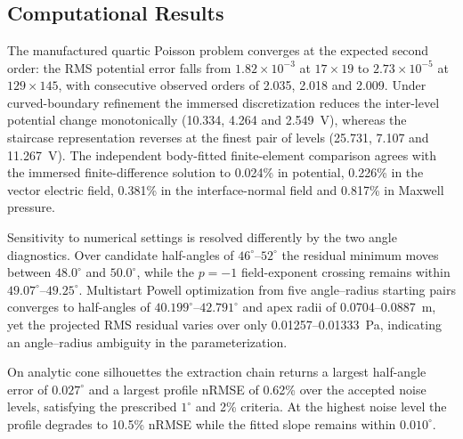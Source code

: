 \section{}


\subsection{Computational Results}

The manufactured quartic Poisson problem converges at the expected second order: the RMS potential error falls from $1.82\times10^{-3}$ at $17\times19$ to $2.73\times10^{-5}$ at $129\times145$, with consecutive observed orders of 2.035, 2.018 and 2.009. Under curved-boundary refinement the immersed discretization reduces the inter-level potential change monotonically (10.334, 4.264 and 2.549~V), whereas the staircase representation reverses at the finest pair of levels (25.731, 7.107 and 11.267~V). The independent body-fitted finite-element comparison agrees with the immersed finite-difference solution to 0.024\% in potential, 0.226\% in the vector electric field, 0.381\% in the interface-normal field and 0.817\% in Maxwell pressure.

Sensitivity to numerical settings is resolved differently by the two angle diagnostics. Over candidate half-angles of $46^\circ$--$52^\circ$ the residual minimum moves between $48.0^\circ$ and $50.0^\circ$, while the $p=-1$ field-exponent crossing remains within $49.07^\circ$--$49.25^\circ$. Multistart Powell optimization from five angle--radius starting pairs converges to half-angles of $40.199^\circ$--$42.791^\circ$ and apex radii of 0.0704--0.0887~m, yet the projected RMS residual varies over only 0.01257--0.01333~Pa, indicating an angle--radius ambiguity in the parameterization.

On analytic cone silhouettes the extraction chain returns a largest half-angle error of $0.027^\circ$ and a largest profile nRMSE of 0.62\% over the accepted noise levels, satisfying the prescribed $1^\circ$ and 2\% criteria. At the highest noise level the profile degrades to 10.5\% nRMSE while the fitted slope remains within $0.010^\circ$.

